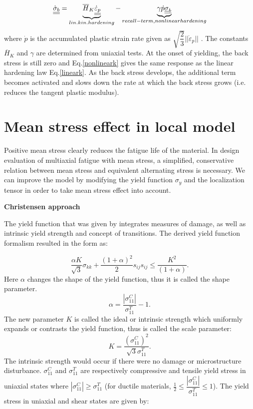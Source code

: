 \begin{equation}
\uline{\uline{\dot{\sigma}_b}}=\underbrace{\overline{H}_K \uline{\uline{\dot{\varepsilon}_p}}}_{lin. kin. hardening} -\underbrace{\gamma\dot{p}\uline{\uline{\sigma}_b}}_{recall - term, nonlinear hardening}
\label{nonlineark}
\end{equation}
where
$\dot{p}$ is the accumulated plastic strain rate given as $\sqrt{\dfrac{2}{3}}||\dot{\varepsilon}_p||$ . The constants
$\overline{H}_K$
and
$\gamma$
are determined from uniaxial tests.
At the onset of yielding, the
back stress is still zero and Eq.\eqref{nonlineark} gives the same response as the linear hardening
law Eq.\eqref{lineark}. As the back stress develops, the additional term becomes activated and
slows down the rate at which the back stress grows (i.e. reduces the tangent plastic
modulus).

\section{Mean stress effect in local model}
\label{sec:5.3}
Positive mean stress clearly reduces the fatigue life of the material. In design evaluation of multiaxial fatigue with mean stress, a simplified, conservative relation between mean stress and equivalent alternating stress is necessary. We can improve the model by modifying the yield function $\sigma_y$ and the localization tensor in order to take mean stress effect into account.

\vspace{6pt}
\textbf{Christensen approach}
\vspace{6pt}

The yield function that was given by \cite{christensen2000yield} integrates measures of damage, as well as intrinsic yield strength and concept of transitions. The derived yield function formalism resulted in the form as:

\begin{equation}
\frac{\alpha K}{\sqrt{3}}\sigma_{kk}+\frac{(1+\alpha)^2}{2}s_{ij}s_{ij}\leqslant\frac{K^2}{(1+\alpha)}.
\label{eq:yieldfunc}
\end{equation}
Here $\alpha$ changes the shape of the yield function, thus it is called the shape parameter. 
$$\alpha=\frac{\left| \sigma_{11}^C\right| }{\sigma_{11}^T}-1.$$
The new parameter $K$ is called the ideal or intrinsic strength which uniformly expands or contrasts the yield function, thus is called the scale parameter:
$$K=\frac{(\sigma_{11}^C)^2}{\sqrt{3}\sigma_{11}^T}.$$
The intrinsic strength would occur if there were no damage or microstructure disturbance. 
$\sigma_{11}^C$ and $\sigma_{11}^T$ are respectively compressive and tensile yield stress in uniaxial states where $\left| \sigma_{11}^C\right| \geqslant\sigma_{11}^T$ (for ductile materials, $\frac{1}{2}\leqslant\dfrac{\left| \sigma_{11}^C\right| }{\sigma_{11}^T}\leqslant 1$). The yield stress in uniaxial and shear states are given by:

